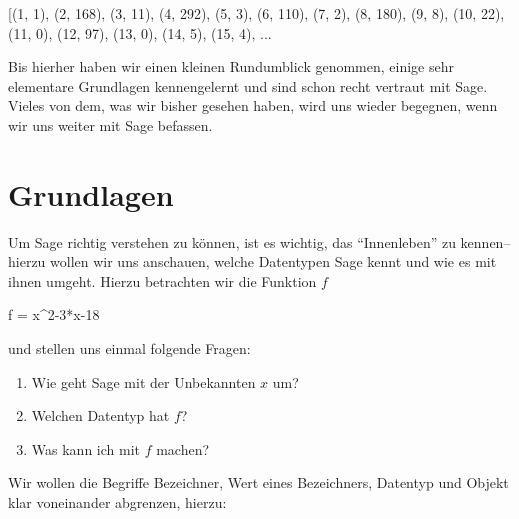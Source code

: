 \documentclass[fontsize=12pt,paper=a4,twoside,bibtotoc,idxtotoc,
liststotoc,pagesize,BCOR1.2cm,DIV15,chapterprefix,pagesize=pdftex]{scrbook}
\theoremstyle{plain}
\theoremstyle{definition}
\theoremstyle{remark}
\begin{document}
\begin{sageout}
[(1, 1), (2, 168), (3, 11), (4, 292), (5, 3), (6, 110), (7, 2), (8,
180), (9, 8), (10, 22), (11, 0), (12, 97), (13, 0), (14, 5), (15, 4),
...
\end{sageout}
Bis hierher haben wir einen kleinen Rundumblick genommen, einige sehr elementare Grundlagen kennengelernt und sind schon recht vertraut mit 
Sage. Vieles von dem, was wir bisher gesehen haben, wird uns wieder begegnen, wenn wir uns weiter mit Sage befassen.
\chapter{Grundlagen}
Um Sage richtig verstehen zu können, ist es wichtig, das ``Innenleben'' zu kennen-- hierzu wollen wir uns anschauen, welche Datentypen Sage 
kennt und wie es mit ihnen umgeht. Hierzu betrachten wir die Funktion $f$
\begin{sagein}
f = x^2-3*x-18
\end{sagein}
und stellen uns einmal folgende Fragen:
\begin{enumerate}
 \item Wie geht Sage mit der Unbekannten $x$ um?
 \item Welchen Datentyp hat $f$?
 \item Was kann ich mit $f$ machen?
\end{enumerate}
Wir wollen die Begriffe Bezeichner, Wert eines Bezeichners, Datentyp und Objekt klar voneinander abgrenzen, hierzu:
\end{document}
